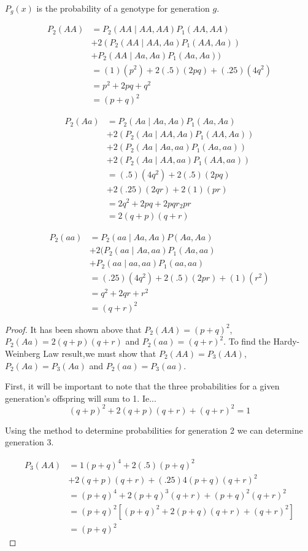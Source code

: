\documentclass{tufte-book}
\theoremstyle{mytheoremstyle}
\theoremstyle{mylemstyle}
\theoremstyle{mydefstyle}
\begin{document}
\begin{enumerate}
$P_g(x)$ is the probability of a genotype for generation $g$.

\begin{align*}
P_2(AA) &= P_2(AA \mid AA,AA)P_1(AA,AA) \\
&+ 2(P_2(AA\mid AA, Aa)P_1(AA,Aa))\\
&+ P_2(AA \mid Aa, Aa)P_1(Aa,Aa))\\
&= (1)(p^2) + 2(.5)(2pq) + (.25)(4q^2)\\
&= p^2 + 2pq + q^2\\
&= (p+q)^2
\end{align*}

\begin{align*}
P_2(Aa) &= P_2(Aa \mid Aa,Aa)P_1(Aa,Aa)\\
&+ 2(P_2(Aa\mid AA, Aa)P_1(AA, Aa))\\
&+ 2(P_2(Aa\mid Aa, aa)P_1(Aa,aa))\\
&+ 2(P_2(Aa\mid AA,aa)P_1(AA,aa))\\
&= (.5)(4q^2) + 2(.5)(2pq) \\
&+ 2(.25)(2qr) + 2(1)(pr)\\
&= 2q^2+2pq+2pqr_2pr \\
&=2(q+p)(q+r)
\end{align*}

\begin{align*}
P_2(aa) &= P_2(aa \mid Aa,Aa)P(Aa,Aa)\\
&+ 2(P_2(aa\mid Aa,aa)P_1(Aa,aa)\\
&+ P_2(aa\mid aa,aa)P_1(aa,aa)\\
&= (.25)(4q^2) + 2(.5)(2pr) + (1)(r^2)\\
&= q^2 + 2qr + r^2\\
&= (q+r)^2
\end{align*}

\begin{proof} It has been shown above that $P_2(AA)=(p+q)^2$, $P_2(Aa)=2(q+p)(q+r)$ and $P_2(aa)=(q+r)^2$.  To find the Hardy-Weinberg Law result,we must show that $P_2(AA)=P_3(AA)$, $P_2(Aa)=P_3(Aa)$ and $P_2(aa)=P_3(aa)$.

First, it will be important to note that the three probabilities for a given generation's offspring will sum to 1.  Ie...
\[ (q+p)^2 + 2(q+p)(q+r) + (q+r)^2 = 1 \]

Using the method to determine probabilities for generation 2 we can determine generation 3.

\begin{align*}
P_3(AA) &= 1(p+q)^4 + 2(.5)(p+q)^2 \\
&+ 2(q+p)(q+r) + (.25)4(p+q)(q+r)^2 \\
&= (p+q)^4 + 2(p+q)^3(q+r)+(p+q)^2(q+r)^2 \\
&= (p+q)^2[(p+q)^2 + 2(p+q)(q+r) + (q+r)^2]\\
&= (p+q)^2
\end{align*}


\end{proof}
\end{enumerate}
\end{document}
